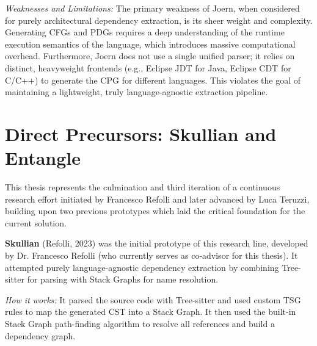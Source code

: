 \textit{Weaknesses and Limitations:} The primary weakness of Joern,
when considered for purely architectural dependency extraction, is
its sheer weight and complexity. Generating CFGs and PDGs requires a
deep understanding of the runtime execution semantics of the
language, which introduces massive computational overhead.
Furthermore, Joern does not use a single unified parser; it relies on
distinct, heavyweight frontends (e.g., Eclipse JDT for Java, Eclipse
CDT for C/C++) to generate the CPG for different languages. This
violates the goal of maintaining a lightweight, truly
language-agnostic extraction pipeline.

\section{Direct Precursors: Skullian and Entangle}

This thesis represents the culmination and third iteration of a
continuous research effort initiated by Francesco Refolli and later
advanced by Luca Teruzzi, building upon two previous prototypes
which laid the critical foundation for the current solution.

\textbf{Skullian} (Refolli, 2023) \cite{refolli_2023} was the initial
prototype of this research line, developed by Dr. Francesco Refolli
(who currently serves as co-advisor for this thesis). It attempted purely
language-agnostic dependency extraction by combining Tree-sitter for
parsing with Stack Graphs for name resolution.

\textit{How it works:} It parsed the source code with Tree-sitter and
used custom TSG rules to map the generated CST into a Stack Graph. It
then used the built-in Stack Graph path-finding algorithm to resolve
all references and build a dependency graph.

